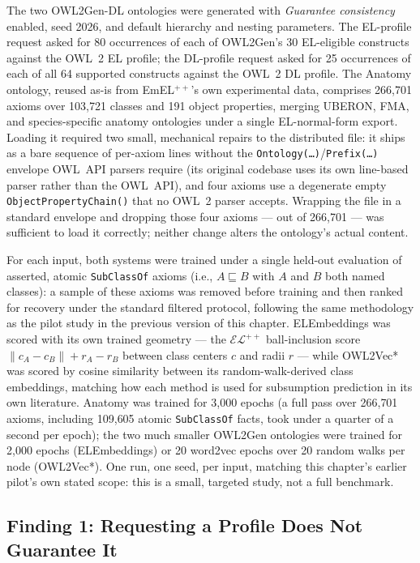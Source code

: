 The two OWL2Gen-DL ontologies were generated with \emph{Guarantee consistency} enabled, seed 2026, and default hierarchy and nesting parameters. The EL-profile request asked for 80 occurrences of each of OWL2Gen's 30 EL-eligible constructs against the OWL~2 EL profile; the DL-profile request asked for 25 occurrences of each of all 64 supported constructs against the OWL~2 DL profile. The Anatomy ontology, reused as-is from EmEL$^{++}$'s own experimental data, comprises 266{,}701 axioms over 103{,}721 classes and 191 object properties, merging UBERON, FMA, and species-specific anatomy ontologies under a single EL-normal-form export. Loading it required two small, mechanical repairs to the distributed file: it ships as a bare sequence of per-axiom lines without the \texttt{Ontology(\ldots)}/\texttt{Prefix(\ldots)} envelope OWL~API parsers require (its original codebase uses its own line-based parser rather than the OWL~API), and four axioms use a degenerate empty \texttt{ObjectPropertyChain()} that no OWL~2 parser accepts. Wrapping the file in a standard envelope and dropping those four axioms — out of 266{,}701 — was sufficient to load it correctly; neither change alters the ontology's actual content.

For each input, both systems were trained under a single held-out evaluation of asserted, atomic \texttt{SubClassOf} axioms (i.e., $A\sqsubseteq B$ with $A$ and $B$ both named classes): a sample of these axioms was removed before training and then ranked for recovery under the standard filtered protocol, following the same methodology as the pilot study in the previous version of this chapter. ELEmbeddings was scored with its own trained geometry — the $\mathcal{EL}^{++}$ ball-inclusion score $\lVert c_A-c_B\rVert+r_A-r_B$ between class centers $c$ and radii $r$ — while OWL2Vec* was scored by cosine similarity between its random-walk-derived class embeddings, matching how each method is used for subsumption prediction in its own literature. Anatomy was trained for 3{,}000 epochs (a full pass over 266{,}701 axioms, including 109{,}605 atomic \texttt{SubClassOf} facts, took under a quarter of a second per epoch); the two much smaller OWL2Gen ontologies were trained for 2{,}000 epochs (ELEmbeddings) or 20 word2vec epochs over 20 random walks per node (OWL2Vec*). One run, one seed, per input, matching this chapter's earlier pilot's own stated scope: this is a small, targeted study, not a full benchmark.

\subsection{Finding 1: Requesting a Profile Does Not Guarantee It}
\label{sec:study-profile}

